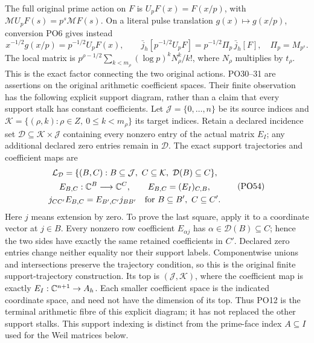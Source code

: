 The full original prime action on \(F\) is
\(U_pF(x)=F(x/p)\), with \(\mathcal M U_pF(s)=p^s\mathcal M F(s)\).
On a literal pulse translation \(g(x)\mapsto g(x/p)\),
conversion PO6 gives instead
\[
 x^{-1/2}g(x/p)=p^{-1/2}U_pF(x),\qquad
 \bar j_h[p^{-1/2}U_pF]
    =p^{-1/2}\Pi_p\,\bar j_h[F],\quad
 \Pi_p=M_{p^s}.
 \tag{PO31}\label{PO:po:prime-factor}
\]
The local matrix is
\(p^{\rho-1/2}\sum_{k<m_\rho}
(\log p)^kN_\rho^k/k!\), where \(N_\rho\) multiplies by
\(t_\rho\). This is the exact factor connecting the two
original actions.
PO30--31 are assertions on the original arithmetic coefficient
spaces. Their finite observation has the following explicit
support diagram, rather than a claim that every support stalk
has constant coefficients. Let \(\mathcal J=\{0,\ldots,n\}\)
be its source indices and
\(\mathcal K=\{(\rho,k):\rho\in Z,\ 0\le k<m_\rho\}\)
its target indices. Retain a declared incidence set
\(\mathcal D\subseteq\mathcal K\times\mathcal J\) containing
every nonzero entry of the actual matrix \(E_I\); any additional
declared zero entries remain in \(\mathcal D\).
The exact support trajectories and coefficient maps are
\[
 \begin{gathered}
 \mathcal L_{\mathcal D}
  =\{(B,C):B\subseteq\mathcal J,\ C\subseteq\mathcal K,\
                         \mathcal D(B)\subseteq C\},\\
 E_{B,C}:\mathbb C^B\longrightarrow\mathbb C^C,\qquad
 E_{B,C}=(E_I)_{C,B},\\
 j_{CC'}E_{B,C}=E_{B',C'}j_{BB'}
       \quad\text{for }B\subseteq B',\ C\subseteq C'.
 \end{gathered}
 \tag{PO54}\label{PO:po:support-square}
\]
Here \(j\) means extension by zero. To prove the last square,
apply it to a coordinate vector at \(j\in B\).
Every nonzero row coefficient \(E_{\alpha j}\) has
\(\alpha\in\mathcal D(B)\subseteq C\); hence the two sides
have exactly the same retained coefficients in \(C'\).
Declared zero entries change neither equality nor their
support labels. Componentwise unions and intersections preserve
the trajectory condition, so this is the original finite
support-trajectory construction. Its top is
\((\mathcal J,\mathcal K)\), where the coefficient map is
exactly \(E_I:\mathbb C^{n+1}\to A_h\).
Each smaller coefficient space is the indicated coordinate
space, and need not have the dimension of its top.
Thus PO12 is the terminal arithmetic fibre of this explicit
diagram; it has not replaced the other support stalks.
This support indexing is distinct from the prime-face index
\(A\subseteq I\) used for the Weil matrices below.

